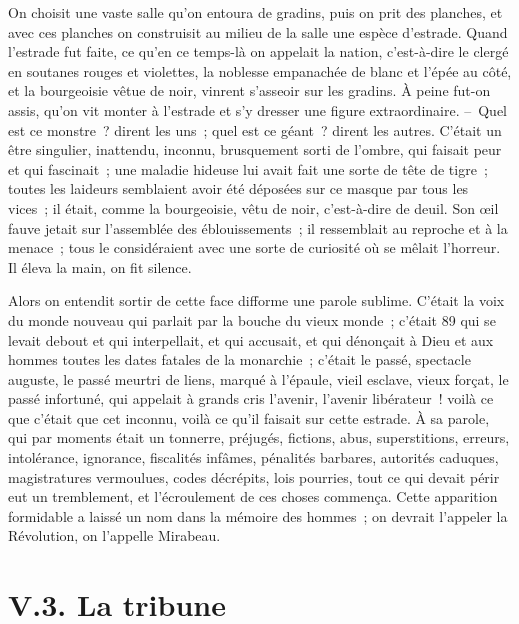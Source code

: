 \documentclass[french,twoside]{book} %
\begin{document}
\noindent On choisit une vaste salle qu’on entoura de gradins, puis on prit des planches, et avec ces planches on construisit au milieu de la salle une espèce d’estrade. Quand l’estrade fut faite, ce qu’en ce temps-là on appelait la nation, c’est-à-dire le clergé en soutanes rouges et violettes, la noblesse empanachée de blanc et l’épée au côté, et la bourgeoisie vêtue de noir, vinrent s’asseoir sur les gradins. À peine fut-on assis, qu’on vit monter à l’estrade et s’y dresser une figure extraordinaire. – Quel est ce monstre ? dirent les uns ; quel est ce géant ? dirent les autres. C’était un être singulier, inattendu, inconnu, brusquement sorti de l’ombre, qui faisait peur et qui fascinait ; une maladie hideuse lui avait fait une sorte de tête de tigre ; toutes les laideurs semblaient avoir été déposées sur ce masque par tous les vices ; il était, comme la bourgeoisie, vêtu de noir, c’est-à-dire de deuil. Son œil fauve jetait sur l’assemblée des éblouissements ; il ressemblait au reproche et à la menace ; tous le considéraient avec une sorte de curiosité où se mêlait l’horreur. Il éleva la main, on fit silence.\par
Alors on entendit sortir de cette face difforme une parole sublime. C’était la voix du monde nouveau qui parlait par la bouche du vieux monde ; c’était 89 qui se levait debout et qui interpellait, et qui accusait, et qui dénonçait à Dieu et aux hommes toutes les dates fatales de la monarchie ; c’était le passé, spectacle auguste, le passé meurtri de liens, marqué à l’épaule, vieil esclave, vieux forçat, le passé infortuné, qui appelait à grands cris l’avenir, l’avenir libérateur ! voilà ce que c’était que cet inconnu, voilà ce qu’il faisait sur cette estrade. À sa parole, qui par moments était un tonnerre, préjugés, fictions, abus, superstitions, erreurs, intolérance, ignorance, fiscalités infâmes, pénalités barbares, autorités caduques, magistratures vermoulues, codes décrépits, lois pourries, tout ce qui devait périr eut un tremblement, et l’écroulement de ces choses commença. Cette apparition formidable a laissé un nom dans la mémoire des hommes ; on devrait l’appeler la Révolution, on l’appelle Mirabeau.

\section[{V.3. La tribune}]{V.3. La tribune}
\end{document}
